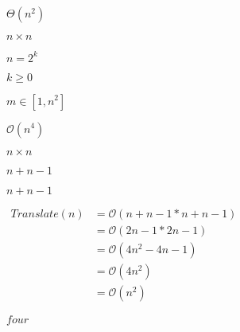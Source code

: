 \documentclass[10pt]{book}
\begin{document}
\begin{mdSnippets}
\begin{mdInlineSnippet}%
$\Theta(n^2)$\end{mdInlineSnippet}%
\begin{mdInlineSnippet}[50f17e5c11d610b19c0471830dc4dda1]%
$n \times n$\end{mdInlineSnippet}%
\begin{mdInlineSnippet}[33008d367d78c30912395475b6ff07bf]%
$n = 2^k$\end{mdInlineSnippet}%
\begin{mdInlineSnippet}%
$k \ge 0$\end{mdInlineSnippet}%
\begin{mdInlineSnippet}[0fd7f2aaa3b92a95de4e9e9a87491a2b]%
$m \in [1, n^2]$\end{mdInlineSnippet}%
\begin{mdInlineSnippet}[a28248963be70027ea85b7d0d14cc134]%
$\mathcal{O}(n^4)$\end{mdInlineSnippet}%
\begin{mdInlineSnippet}[50f17e5c11d610b19c0471830dc4dda1]%
$n \times n$\end{mdInlineSnippet}%
\begin{mdInlineSnippet}[9ec3d568cb98cdb6a2dd4991689a3434]%
$n + n - 1$\end{mdInlineSnippet}%
\begin{mdInlineSnippet}[9ec3d568cb98cdb6a2dd4991689a3434]%
$n + n - 1$\end{mdInlineSnippet}%
\begin{mdInlineSnippet}[0fe62c4ee58ec09534ffa40345e24d54]%
$\begin{aligned}Translate(n) &= \mathcal{O}(n + n - 1 * n + n - 1)\\&= \mathcal{O}(2n - 1 * 2n - 1)\\&= \mathcal{O}(4n^2 - 4n - 1)\\&= \mathcal{O}(4n^2)\\&= \mathcal{O}(n^2)\end{aligned}$\end{mdInlineSnippet}%
\begin{mdInlineSnippet}%
$four$\end{mdInlineSnippet}%

\end{mdSnippets}
\end{document}
